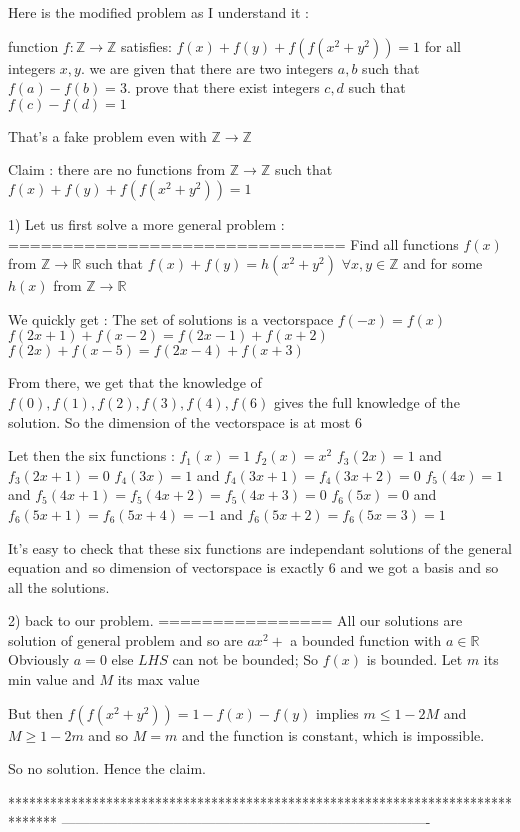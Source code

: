\begin{solution}
	Here is the modified problem as I understand it :\begin{tcolorbox}function $f:\mathbb Z\rightarrow \mathbb Z$ satisfies:
$f(x)+f(y)+f(f(x^2+y^2))=1$
for all integers $x,y$.
we are given that there are two integers $a,b$ such that $f(a)-f(b)=3$.
prove that there exist integers $c,d$ such that $f(c)-f(d)=1$
\end{tcolorbox}
That's a fake problem even with $\mathbb Z\to\mathbb Z$

Claim : there are no functions from $\mathbb Z\to\mathbb Z$ such that $f(x)+f(y)+f(f(x^2+y^2))=1$

1) Let us first solve a more general problem :
===============================
Find all functions $f(x)$ from $\mathbb Z\to\mathbb R$ such that $f(x)+f(y)=h(x^2+y^2)$ $\forall x,y\in\mathbb Z$ and for some $h(x)$ from $\mathbb Z\to\mathbb R$

We quickly get :
The set of solutions is a vectorspace
$f(-x)=f(x)$
$f(2x+1)+f(x-2)=f(2x-1)+f(x+2)$
$f(2x)+f(x-5)=f(2x-4)+f(x+3)$

From there, we get that the knowledge of $f(0),f(1),f(2),f(3),f(4),f(6)$ gives the full knowledge of the solution. So the dimension of the vectorspace is at most $6$

Let then the six functions :
$f_1(x)=1$
$f_2(x)=x^2$
$f_3(2x)=1$ and $f_3(2x+1)=0$
$f_4(3x)=1$ and $f_4(3x+1)=f_4(3x+2)=0$
$f_5(4x)=1$ and $f_5(4x+1)=f_5(4x+2)=f_5(4x+3)=0$
$f_6(5x)=0$ and $f_6(5x+1)=f_6(5x+4)=-1$ and $f_6(5x+2)=f_6(5x=3)=1$

It's easy to check that these six functions are independant solutions of the general equation and so dimension of vectorspace is exactly $6$ and we got a basis and so all the solutions.

2) back to our problem.
================
All our solutions are solution of general problem and so are $ax^2+$ a bounded function with $a\in\mathbb R$
Obviously $a=0$ else $LHS$ can not be bounded;
So $f(x)$ is bounded. Let $m$ its min value and $M$ its max value

But then $f(f(x^2+y^2))=1-f(x)-f(y)$ implies $m\le 1-2M$ and $M\ge 1-2m$ and so $M=m$ and the function is constant, which is impossible.

So no solution.
Hence the claim.
\end{solution}
*******************************************************************************
-------------------------------------------------------------------------------

